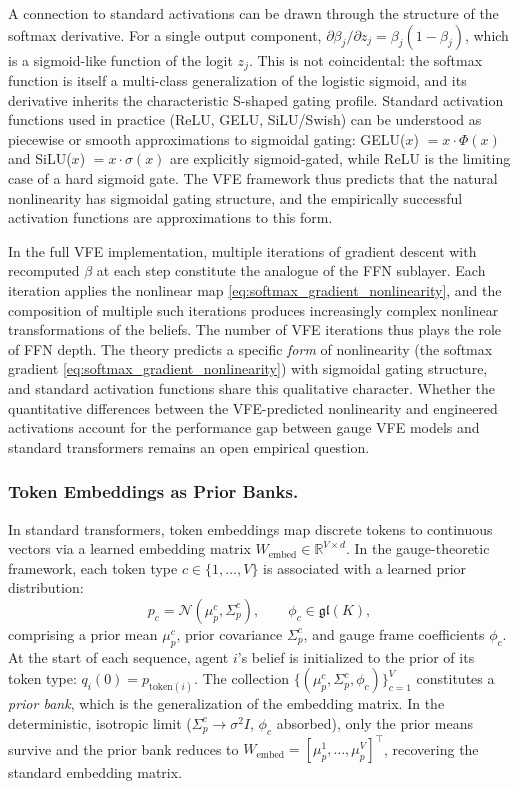 \documentclass[twoside,11pt]{article}
\begin{document}
A connection to standard activations can be drawn through the structure of the softmax derivative. For a single output component, $\partial \beta_j / \partial z_j = \beta_j(1 - \beta_j)$, which is a sigmoid-like function of the logit $z_j$. This is not coincidental: the softmax function is itself a multi-class generalization of the logistic sigmoid, and its derivative inherits the characteristic S-shaped gating profile. Standard activation functions used in practice (ReLU, GELU, SiLU/Swish) can be understood as piecewise or smooth approximations to sigmoidal gating: GELU($x$) $= x \cdot \Phi(x)$ and SiLU($x$) $= x \cdot \sigma(x)$ are explicitly sigmoid-gated, while ReLU is the limiting case of a hard sigmoid gate. The VFE framework thus predicts that the natural nonlinearity has sigmoidal gating structure, and the empirically successful activation functions are approximations to this form.

In the full VFE implementation, multiple iterations of gradient descent with recomputed $\beta$ at each step constitute the analogue of the FFN sublayer. Each iteration applies the nonlinear map \eqref{eq:softmax_gradient_nonlinearity}, and the composition of multiple such iterations produces increasingly complex nonlinear transformations of the beliefs. The number of VFE iterations thus plays the role of FFN depth. The theory predicts a specific \emph{form} of nonlinearity (the softmax gradient \eqref{eq:softmax_gradient_nonlinearity}) with sigmoidal gating structure, and standard activation functions share this qualitative character. Whether the quantitative differences between the VFE-predicted nonlinearity and engineered activations account for the performance gap between gauge VFE models and standard transformers remains an open empirical question.

\subsubsection{Token Embeddings as Prior Banks.}
\label{sec:embeddings}

In standard transformers, token embeddings map discrete tokens to continuous vectors via a learned embedding matrix $W_{\text{embed}} \in \mathbb{R}^{V \times d}$. In the gauge-theoretic framework, each token type $c \in \{1, \ldots, V\}$ is associated with a learned prior distribution:
\begin{equation}
p_c = \mathcal{N}(\mu_p^c, \Sigma_p^c), \qquad \phi_c \in \mathfrak{gl}(K),
\label{eq:prior_bank}
\end{equation}
comprising a prior mean $\mu_p^c$, prior covariance $\Sigma_p^c$, and gauge frame coefficients $\phi_c$. At the start of each sequence, agent $i$'s belief is initialized to the prior of its token type: $q_i(0) = p_{\mathrm{token}(i)}$. The collection $\{(\mu_p^c, \Sigma_p^c, \phi_c)\}_{c=1}^V$ constitutes a \emph{prior bank}, which is the generalization of the embedding matrix. In the deterministic, isotropic limit ($\Sigma_p^c \to \sigma^2 I$, $\phi_c$ absorbed), only the prior means survive and the prior bank reduces to $W_{\text{embed}} = [\mu_p^1, \ldots, \mu_p^V]^\top$, recovering the standard embedding matrix.
\end{document}
